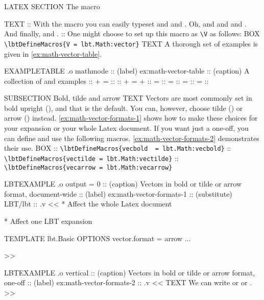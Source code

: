 \begin{lbt}
    LATEX \FloatBarrier
    SECTION The  macro

    TEXT
    :: With the  macro you can easily typeset  and  and . Oh, and  and  and . And finally,  and .
    :: One might choose to set up this macro as \Verb|\V| as follows:
    BOX \verb|\lbtDefineMacros{V = lbt.Math:vector}|
    TEXT A thorough set of examples is given in \cref{ex:math-vector-table}.

    EXAMPLETABLE .o mathmode
    :: (label) ex:math-vector-table
    :: (caption) A collection of  and  examples
    ::  +  = 
    :: 
    ::  +  =  + 
    ::  = 
    ::  = 
    ::  = 
    ::  = 
    :: 

    SUBSECTION Bold, tilde and arrow
    TEXT Vectors are most commonly set in bold upright (), and that is the \lbtlogo{} default. You can, however, choose tilde () or arrow () instead. \cref{ex:math-vector-formats-1} shows how to make these choices for your \lbtlogo{} expansion or your whole Latex document. If you want just a one-off, you can define and use the following macros. \cref{ex:math-vector-formats-2} demonstrates their use.
    BOX
    :: \verb|\lbtDefineMacros{vecbold  = lbt.Math:vecbold}|
    :: \verb|\lbtDefineMacros{vectilde = lbt.Math:vectilde}|
    :: \verb|\lbtDefineMacros{vecarrow = lbt.Math:vecarrow}|

    LBTEXAMPLE .o output = 0
    :: (caption) Vectors in bold or tilde or arrow format, document-wide
    :: (label) ex:math-vector-formats-1
    :: (substitute) LBT/lbt
    :: .v <<
      * Affect the whole Latex document

      * Affect one LBT expansion
      \begin{LBT}
        [@META]
          TEMPLATE lbt.Basic
          OPTIONS  vector.format = arrow
        ...
      \end{LBT}
    >>

    LBTEXAMPLE .o vertical
    :: (caption) Vectors in bold or tilde or arrow format, one-off
    :: (label) ex:math-vector-formats-2
    :: .v <<
      TEXT We can write  or  or .
    >>


\end{lbt}
